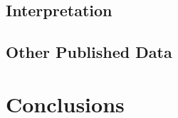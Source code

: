 \documentclass[12pt, a4paper, twoside]{book}
\begin{document}
\section{Interpretation}
\section{Other Published Data}

\chapter{Conclusions} %


\tableofcontents
\listoffigures
\listoftables
\end{document}
